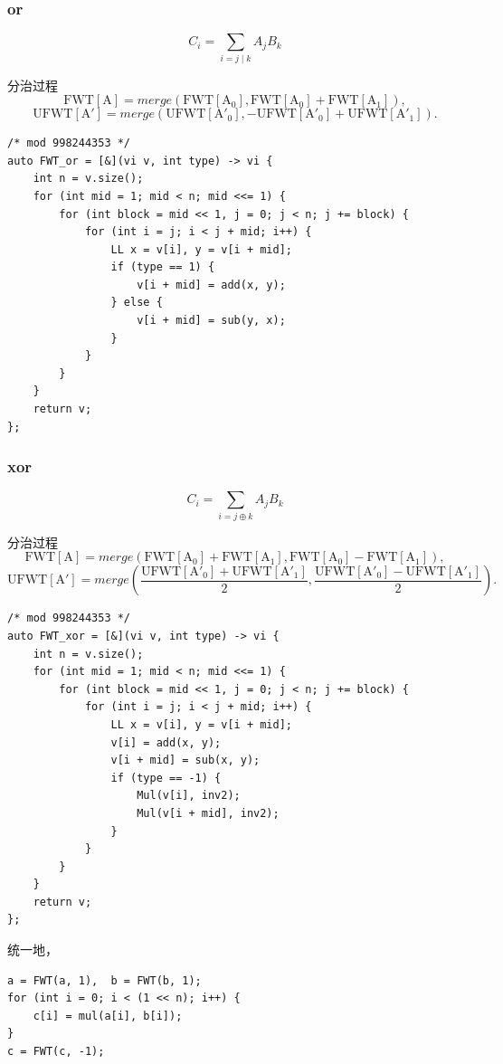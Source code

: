 \documentclass[UTF8, a4paper, titlepage, twoside]{ctexart}
\begin{document}
\subsubsection*{ or }
\[
C_i = \sum\limits_{i = j \mid k} A_j B_k
\]

分治过程
\[
\operatorname{FWT[A]} = merge(\operatorname{FWT[A_0]}, \operatorname{FWT[A_0]} + \operatorname{FWT[A_1]}),
\]
\[
\operatorname{UFWT[A']} = merge(\operatorname{UFWT[A'_0]}, -\operatorname{UFWT[A'_0]} + \operatorname{UFWT[A'_1]}).
\]

\begin{lstlisting}[style=cpp]
/* mod 998244353 */
auto FWT_or = [&](vi v, int type) -> vi {
    int n = v.size();
    for (int mid = 1; mid < n; mid <<= 1) {
        for (int block = mid << 1, j = 0; j < n; j += block) {
            for (int i = j; i < j + mid; i++) {
                LL x = v[i], y = v[i + mid];
                if (type == 1) {
                    v[i + mid] = add(x, y);
                } else {
                    v[i + mid] = sub(y, x);
                }
            }
        }
    }
    return v;
};
\end{lstlisting}

\subsubsection*{ xor }
\[
C_i = \sum\limits_{i = j \oplus k} A_j B_k
\]

分治过程
\[
\operatorname{FWT[A]} = merge(\operatorname{FWT[A_0]} + \operatorname{FWT[A_1]}, \operatorname{FWT[A_0]} - \operatorname{FWT[A_1]}),
\]
\[
\operatorname{UFWT[A']} = merge\left(\frac{\operatorname{UFWT[A'_0]} + \operatorname{UFWT[A'_1]}}{2}, \frac{\operatorname{UFWT[A'_0]} - \operatorname{UFWT[A'_1]}}{2}\right).
\]

\begin{lstlisting}[style=cpp]
/* mod 998244353 */
auto FWT_xor = [&](vi v, int type) -> vi {
    int n = v.size();
    for (int mid = 1; mid < n; mid <<= 1) {
        for (int block = mid << 1, j = 0; j < n; j += block) {
            for (int i = j; i < j + mid; i++) {
                LL x = v[i], y = v[i + mid];
                v[i] = add(x, y);
                v[i + mid] = sub(x, y);
                if (type == -1) {
                    Mul(v[i], inv2);
                    Mul(v[i + mid], inv2);
                }
            }
        }
    }
    return v;
};
\end{lstlisting}

统一地，
\begin{lstlisting}[style=cpp]
a = FWT(a, 1),  b = FWT(b, 1);
for (int i = 0; i < (1 << n); i++) {
    c[i] = mul(a[i], b[i]);
}
c = FWT(c, -1);
\end{lstlisting}
\end{document}
